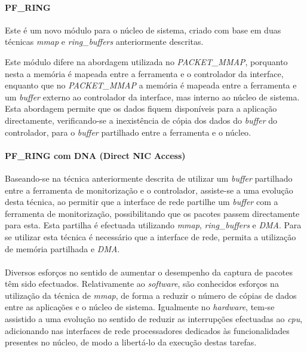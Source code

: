 \paragraph*{PF\_RING}

Este é um novo módulo para o núcleo de sistema, criado com base em duas técnicas \textit{mmap} e \textit{ring\_buffers} anteriormente descritas.

Este módulo difere na abordagem utilizada no \textit{PACKET\_MMAP}, porquanto nesta a memória é mapeada entre a ferramenta e o controlador da interface, enquanto que no \textit{PACKET\_MMAP} a memória é mapeada entre a ferramenta e um \textit{buffer} externo ao controlador da interface, mas interno ao núcleo de sistema.
Esta abordagem permite que os dados fiquem disponíveis para a aplicação directamente, verificando-se a inexistência de cópia dos dados do \textit{buffer} do controlador, para o \textit{buffer} partilhado entre a ferramenta e o núcleo\cite{PFRING}.
 
\paragraph*{PF\_RING com DNA (Direct NIC Access)}
Baseando-se na técnica anteriormente descrita de utilizar um \textit{buffer} partilhado entre a ferramenta de monitorização e o controlador, assiste-se a uma evolução desta técnica, ao permitir que a interface de rede partilhe um \textit{buffer} com a ferramenta de monitorização, possibilitando que os pacotes passem directamente para esta\cite{IntroPF_RIDNADirecNICAcces}.
Esta partilha é efectuada utilizando \textit{mmap}, \textit{ring\_buffers} e \textit{DMA}.
Para se utilizar esta técnica é necessário que a interface de rede, permita a utilização de memória partilhada e \textit{DMA}.

\paragraph*{}

Diversos esforços no sentido de aumentar o desempenho da captura de pacotes têm sido efectuados.
Relativamente ao \textit{software}, são conhecidos esforços na utilização da técnica de \textit{mmap}, de forma a reduzir o número de cópias de dados entre as aplicações e o núcleo de sistema.
Igualmente no \textit{hardware}, tem-se assistido a uma evolução no sentido de reduzir as interrupções efectuadas ao \textit{cpu}, adicionando nas interfaces de rede processadores dedicados às funcionalidades presentes no núcleo, de modo a libertá-lo da execução destas tarefas.


